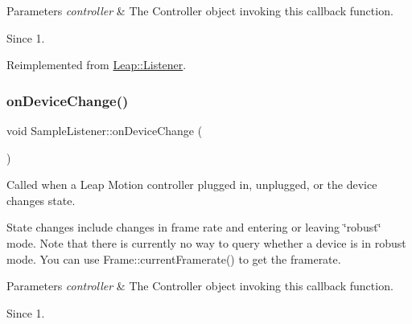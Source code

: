 \begin{DoxyCodeInclude}
\end{DoxyCodeInclude}



\begin{DoxyParams}{Parameters}
{\em controller} & The Controller object invoking this callback function. \\
\hline
\end{DoxyParams}
\begin{DoxySince}{Since}
1. 
\end{DoxySince}


Reimplemented from \hyperlink{class_leap_1_1_listener_adb6de7817e0b316b82f781a03aae5448}{Leap\+::\+Listener}.

\mbox{\label{class_sample_listener_a2658fbd2db372f676d9d70665c637af3}} 
\subsubsection{\texorpdfstring{on\+Device\+Change()}{onDeviceChange()}\hspace{0.1cm}{\footnotesize\ttfamily [2/2]}}
{\footnotesize\ttfamily void Sample\+Listener\+::on\+Device\+Change (\begin{DoxyParamCaption}\item[{const \hyperlink{class_leap_1_1_controller}{Controller} \&}]{ }\end{DoxyParamCaption})\hspace{0.3cm}{\ttfamily [virtual]}}

Called when a Leap Motion controller plugged in, unplugged, or the device changes state.

State changes include changes in frame rate and entering or leaving \char`\"{}robust\char`\"{} mode. Note that there is currently no way to query whether a device is in robust mode. You can use Frame\+::current\+Framerate() to get the framerate.


\begin{DoxyCodeInclude}
\end{DoxyCodeInclude}



\begin{DoxyParams}{Parameters}
{\em controller} & The Controller object invoking this callback function. \\
\hline
\end{DoxyParams}
\begin{DoxySince}{Since}
1. 
\end{DoxySince}



